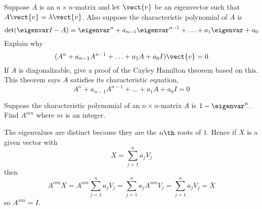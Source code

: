 \begin{ex}
  Suppose $A$ is an $n\times n$-matrix and let $\vect{v}$ be an
  eigenvector such that $A\vect{v}=\lambda \vect{v}$. Also suppose the
  characteristic polynomial of $A$ is
  \begin{equation*}
    \det (\eigenvar  I-A) =\eigenvar  ^{n}+a_{n-1} \eigenvar  ^{n-1}+\ldots+a_{1}\eigenvar  +a_{0}
  \end{equation*}
  Explain why
  \begin{equation*}
    (A^{n}+a_{n-1}A^{n-1}+\ldots +a_{1}A+a_{0}I) \vect{v}=0
  \end{equation*}
  If $A$ is diagonalizable, give a proof of the Cayley Hamilton
  theorem based on this. This theorem says $A$ satisfies its
  characteristic equation,
  \begin{equation*}
    A^{n}+a_{n-1}A^{n-1}+\ldots +a_{1}A+a_{0}I=0
  \end{equation*}
\end{ex}

\begin{ex}
  Suppose the characteristic polynomial of an $n\times n$-matrix $A$ is
  $1-\eigenvar ^{n}$. Find $A^{mn}$ where $m$ is an integer.
  \begin{sol}
    The eigenvalues are distinct because
    they are the $n\th$ roots of $1$. Hence if $X$ is a given vector with
    \begin{equation*}
      X=\sum_{j=1}^{n}a_{j}V_{j}
    \end{equation*}
    then
    \begin{equation*}
      A^{nm}X=A^{nm}\sum_{j=1}^{n}a_{j}V_{j}=
      \sum_{j=1}^{n}a_{j}A^{nm}V_{j}=\sum_{j=1}^{n}a_{j}V_{j}=X
    \end{equation*}
    so $A^{nm}=I$.
  \end{sol}
\end{ex}

